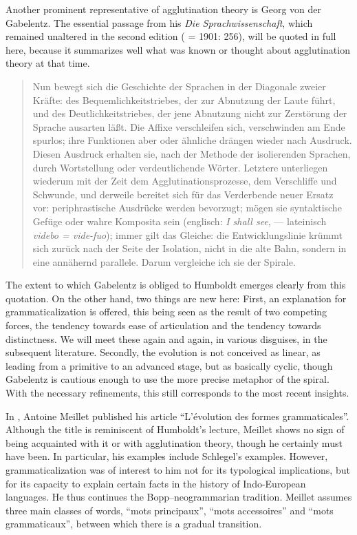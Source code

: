 Another prominent representative of agglutination theory is Georg von der Gabelentz. The essential passage from his \textit{Die Sprachwissenschaft}, which remain\-ed unaltered in the second edition (\citeyear[251]{Gabelentz1891} = 1901: 256), will be quoted in full here, because it summarizes well what was known or thought about agglutination theory at that time.

\begin{quote}
	Nun bewegt sich die Geschichte der Sprachen in der Diagonale zweier Kräfte: des Bequemlichkeitstriebes, der zur Abnutzung der Laute führt, und des Deutlichkeitstriebes, der jene Abnutzung nicht zur Zerstörung der Sprache ausarten läßt. Die Affixe verschleifen sich, verschwinden am Ende spurlos; ihre Funktionen aber oder ähnliche drängen wieder nach Ausdruck. Diesen Ausdruck erhalten sie, nach der Methode der isolierenden Sprachen, durch Wortstellung oder verdeutlichende Wörter. Letztere unterliegen wiederum mit der Zeit dem Agglutinationsprozesse, dem Verschliffe und Schwunde, und derweile bereitet sich für das Verderbende neuer Ersatz vor: periphrastische Ausdrücke werden bevorzugt; mögen sie syntaktische Gefüge oder wahre Komposita sein (englisch: \textit{I shall see}, — lateinisch \textit{videbo = vide-fuo}); immer gilt das Gleiche: die Entwicklungslinie krümmt sich zurück nach der Seite der Isolation, nicht in die alte Bahn, sondern in eine annähernd parallele. Darum vergleiche ich sie der Spirale.
\end{quote}
The extent to which Gabelentz is obliged to Humboldt emerges clearly from this quotation. On the other hand, two things are new here: First, an explanation for grammaticalization is offered, this being seen as the result of two competing forces, the tendency towards ease of articulation and the tendency towards distinctness. We will meet these again and again, in various disguises, in the subsequent literature. Secondly, the evolution is not conceived as linear, as leading from a primitive to an advanced stage, but as basically cyclic, though Gabelentz is cautious enough to use the more precise metaphor of the spiral. With the necessary refinements, this still corresponds to the most recent insights.

In \citeyear{Meillet1912}, Antoine Meillet published his article “L'évolution des formes grammaticales”. Although the title is reminiscent of Humboldt's lecture, Meillet shows no sign of being acquainted with it or with agglutination theory, though he certainly must have been. In particular, his examples include Schlegel's examples. However, grammaticalization was of interest to him not for its typological implications, but for its capacity to explain certain facts in the history of Indo-European languages. He thus continues the Bopp--neogrammarian tradition. Meillet assumes three main classes of words, “mots principaux”, “mots accessoires” and “mots grammaticaux”, between which there is a gradual transition.

